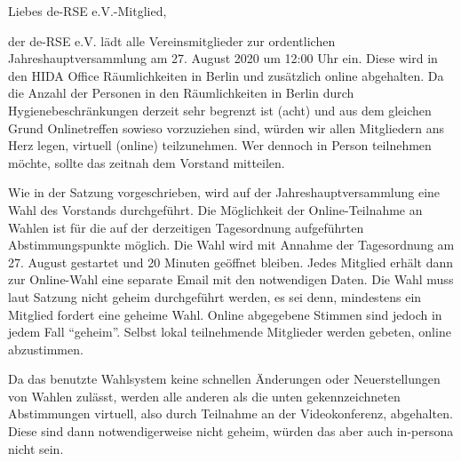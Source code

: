 \documentclass[../Vorlagen/de-RSE_Brief,a4paper]{scrlttr2}
\begin{document}

\begin{letter}{\mbox{}
}
\opening{Liebes de-RSE e.V.-Mitglied,}

der de-RSE e.V. lädt alle Vereinsmitglieder zur ordentlichen Jahreshauptversammlung am 27. August 2020 um 12:00 Uhr ein.
Diese wird in den HIDA Office Räumlichkeiten in Berlin und zusätzlich online abgehalten.
Da die Anzahl der Personen in den Räumlichkeiten in Berlin durch Hygienebeschränkungen derzeit sehr begrenzt ist (acht) und aus dem gleichen Grund Onlinetreffen sowieso vorzuziehen sind, würden wir allen Mitgliedern ans Herz legen, virtuell (online) teilzunehmen.
Wer dennoch in Person teilnehmen möchte, sollte das zeitnah dem Vorstand mitteilen.

Wie in der Satzung vorgeschrieben, wird auf der Jahreshauptversammlung eine Wahl des Vorstands durchgeführt.
Die Möglichkeit der Online-Teilnahme an Wahlen ist für die auf der derzeitigen Tagesordnung aufgeführten Abstimmungspunkte möglich.
Die Wahl wird mit Annahme der Tagesordnung am 27. August gestartet und 20 Minuten geöffnet bleiben.
Jedes Mitglied erhält dann zur Online-Wahl eine separate Email mit den notwendigen Daten.
Die Wahl muss laut Satzung nicht geheim durchgeführt werden, es sei denn, mindestens ein Mitglied fordert eine geheime Wahl.
Online abgegebene Stimmen sind jedoch in jedem Fall "`geheim"'.
Selbst lokal teilnehmende Mitglieder werden gebeten, online abzustimmen.

Da das benutzte Wahlsystem keine schnellen Änderungen oder Neuerstellungen von Wahlen zulässt, werden alle anderen als die unten gekennzeichneten Abstimmungen virtuell, also durch Teilnahme an der Videokonferenz, abgehalten.
Diese sind dann notwendigerweise nicht geheim, würden das aber auch in-persona nicht sein.


\end{letter}
\end{document}
